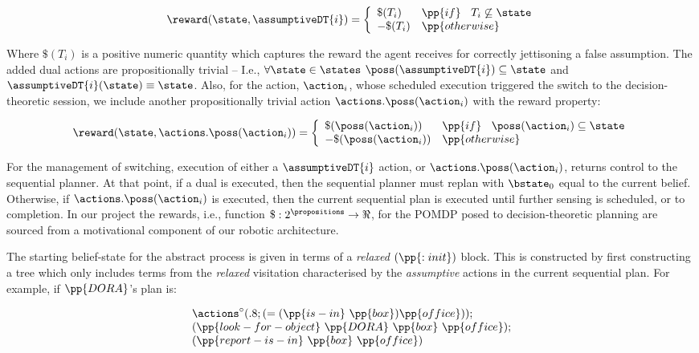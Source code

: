 \[
\reward(\state, \assumptiveDT{i}) = \bigg\{ \begin{array}{ll}
\$(T_i) & \pp{if}~\;\;T_i \not\subseteq \state \\
-\$(T_i) & \pp{otherwise} \\
\end{array}
\]

\noindent Where $\$(T_i)$ is a positive numeric quantity which
captures the reward the agent receives for correctly jettisoning a
false assumption. The added dual actions are propositionally trivial
-- I.e., $\forall\state\in\states$ $\poss(\assumptiveDT{i})
\subseteq \state$ and $\assumptiveDT{i}(\state) \equiv \state$.  Also, for the action,
$\action_i$, whose scheduled execution triggered the switch to the
decision-theoretic session, we include another propositionally trivial
action $\actions.\poss(\action_i)$ with the reward property:

\[
\reward(\state, \actions.\poss(\action_i)) = \bigg\{ \begin{array}{ll}
\$(\poss(\action_i)) & \pp{if}~\;\; \poss(\action_i) \subseteq \state \\
-\$(\poss(\action_i)) & \pp{otherwise} \\
\end{array}
\]


For the management of switching, execution of either a
$\assumptiveDT{i}$ action, or $\actions.\poss(\action_i)$, returns
control to the sequential planner. At that point, if a dual is
executed, then the sequential planner must replan with $\bstate_0$
equal to the current belief. Otherwise, if $\actions.\poss(\action_i)$
is executed, then the current sequential plan is executed until
further sensing is scheduled, or to completion. In our project the
rewards, i.e., function $\$:2^\propositions\to\Re$, for the POMDP
posed to decision-theoretic planning are sourced from a motivational
component of our robotic architecture.

The starting belief-state for the abstract process is given in terms
of a {\em relaxed} $(\pp{:init})$ block.  This is constructed by first
constructing a tree which only includes terms from the {\em relaxed}
visitation characterised by the {\em assumptive} actions in the
current sequential plan. For example, if $\pp{DORA}$'s plan is:

\[
\begin{array}{l}
\actions^{\circ}(.8;(=(\pp{is-in}~\pp{box})\pp{office}));\\
(\pp{look-for-object}~\pp{DORA}~\pp{box}~\pp{office});\\
(\pp{report-is-in}~\pp{box}~\pp{office})
\end{array}
\]

